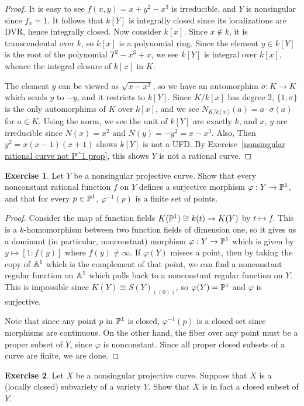 \documentclass[11pt]{book}
\theoremstyle{definition}
\newtheorem{exercise}{Exercise}[section]
\begin{document}
\begin{proof}
It is easy to see $f(x,y)=x+y^2-x^3$ is irreducible, and $Y$ is nonsingular since $f_x=1$. It follows that $k[Y]$ is integrally closed since its localizations are DVR, hence integrally closed. Now consider $k[x]$. Since $x\notin k$, it is transcendental over $k$, so $k[x]$ is a polynomial ring. Since the element $y\in k[Y]$ is the root of the polynomial $T^2-x^3+x$, we see $k[Y]$ is integral over $k[x]$, whence the integral closure of $k[x]$ in $K$.\par
The element $y$ can be viewed as $\sqrt{x-x^3}$, so we have an automorphim $\sigma:K\to K$ which sends $y$ to $-y$, and it restricts to $k[Y]$. Since $K/k[x]$ has degree $2$, $\{1,\sigma\}$ is the only automorphims of $K$ over $k[x]$, and we see $N_{K/k[x]}(a)=a\cdot\sigma(a)$ for $a\in K$. Using the norm, we see the unit of $k[Y]$ are exactly $k$, and $x$, $y$ are irreducible since $N(x)=x^2$ and $N(y)=-y^2=x-x^3$. Also, Then $y^2=x(x-1)(x+1)$ shows $k[Y]$ is not a UFD. By Exercise~\ref{nonsingular rational curve not P^1 prop}, this shows $Y$ is not a rational curve.
\end{proof}
\begin{exercise}
Let $Y$ be a nonsingular projective curve. Show that every nonconstant rational function $f$ on $Y$ defines a surjective morphism $\varphi:Y\to\P^1$, and that for every $p\in\P^1$, $\varphi^{-1}(p)$ is a finite set of points.
\end{exercise}
\begin{proof}
Consider the map of function fields $K(\P^1)\cong k(t)\to K(Y)$ by $t\mapsto f$. This is a $k$-homomorphism between two function fields of dimension one, so it gives us a dominant (in particular, nonconstant) morphism $\varphi:Y\to\P^1$ which is given by $y\mapsto[1:f(y)]$ where $f(y)\neq\infty$. If $\varphi(Y)$ misses a point, then by taking the copy of $\A^1$ which is the complement of that point, we can find a nonconstant regular function on $\A^1$ which pulls back to a nonconstant regular function on $Y$. This is impossible since $K(Y)\cong S(Y)_{((0))}$, so $\varphi(Y)=\P^1$ and $\varphi$ is surjective.\par
Note that since any point $p$ in $\P^1$ is closed, $\varphi^{-1}(p)$ is a closed set since morphisms are continuous. On the other hand, the fiber over any point must be a proper subset of $Y$, since $\varphi$ is nonconstant. Since all proper closed subsets of a curve are finite, we are done.
\end{proof}
\begin{exercise}
Let $X$ be a nonsingular projective curve. Suppose that $X$ is a (locally closed) subvariety of a variety $Y$. Show that $X$ is in fact a closed subset of $Y$.
\end{exercise}
\end{document}

